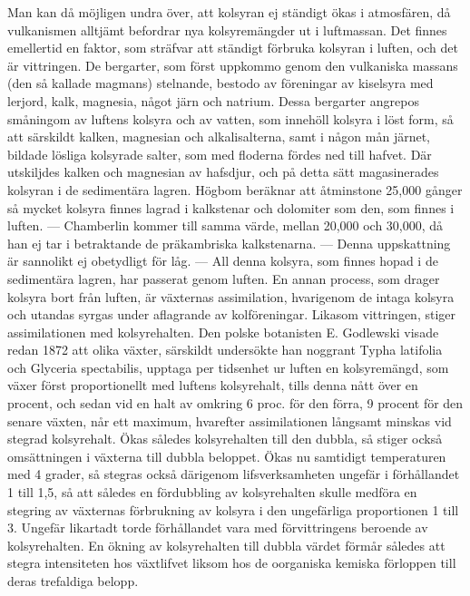 \documentclass[a4paper, 12pt, oneside, swedish]{article}
\begin{document}
Man kan då möjligen undra över, att kolsyran ej ständigt ökas i atmosfären, då vulkanismen alltjämt befordrar nya kolsyremängder ut i luftmassan. Det finnes emellertid en faktor, som sträfvar att ständigt förbruka kolsyran i luften, och det är vittringen. De bergarter, som först uppkommo genom den vulkaniska massans (den så kallade magmans) stelnande, bestodo av föreningar av kiselsyra med lerjord, kalk, magnesia, något järn och natrium. Dessa bergarter angrepos småningom av luftens kolsyra och av vatten, som innehöll kolsyra i löst form, så att särskildt kalken, magnesian och alkalisalterna, samt i någon mån järnet, bildade lösliga kolsyrade salter, som med floderna fördes ned till hafvet. Där utskiljdes kalken och magnesian av hafsdjur, och på detta sätt magasinerades kolsyran i de sedimentära lagren. Högbom beräknar att åtminstone 25,000 gånger så mycket kolsyra finnes lagrad i kalkstenar och dolomiter som den, som finnes i luften. --- Chamberlin kommer till samma värde, mellan 20,000 och 30,000, då han ej tar i betraktande de präkambriska kalkstenarna. --- Denna uppskattning är sannolikt ej obetydligt för låg. --- All denna kolsyra, som finnes hopad i de sedimentära lagren, har passerat genom luften. En annan process, som drager kolsyra bort från luften, är växternas assimilation, hvarigenom de intaga kolsyra och utandas syrgas under aflagrande av kolföreningar. Likasom vittringen, stiger assimilationen med kolsyrehalten. Den polske botanisten E. Godlewski visade redan 1872 att olika växter, särskildt undersökte han noggrant Typha latifolia och Glyceria spectabilis, upptaga per tidsenhet ur luften en kolsyremängd, som växer först proportionellt med luftens kolsyrehalt, tills denna nått över en procent, och sedan vid en halt av omkring 6 proc. för den förra, 9 procent för den senare växten, når ett maximum, hvarefter assimilationen långsamt minskas vid stegrad kolsyrehalt. Ökas således kolsyrehalten till den dubbla, så stiger också omsättningen i växterna till dubbla beloppet. Ökas nu samtidigt temperaturen med 4 grader, så stegras också därigenom lifsverksamheten ungefär i förhållandet 1 till 1,5, så att således en fördubbling av kolsyrehalten skulle medföra en stegring av växternas förbrukning av kolsyra i den ungefärliga proportionen 1 till 3. Ungefär likartadt torde förhållandet vara med förvittringens beroende av kolsyrehalten. En ökning av kolsyrehalten till dubbla värdet förmår således att stegra intensiteten hos växtlifvet liksom hos de oorganiska kemiska förloppen till deras trefaldiga belopp.
\end{document}
